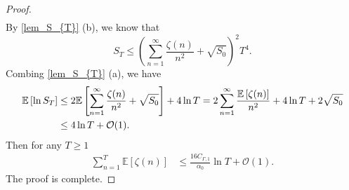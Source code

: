 \documentclass[standalone]{article}
\newcommand{\E}{\mathbb{E}}
\begin{document}
\begin{proof}
\begin{align}
\end{align}
By \cref{lem_S_{T}} (b), we know that $$S_T \leq \left(\sum_{n=1}^{\infty}\frac{\zeta(n)}{n^{2}} + \sqrt{S_0} \right)^2T^4.$$
Combing \cref{lem_S_{T}} (a), we have 
\begin{align}
\E\left[\ln S_T \right] & \leq 2\E\left[\sum_{n=1}^{\infty}\frac{\zeta(n)}{n^{2}} + \sqrt{S_0}\right] + 4\ln T = 2 \sum_{n=1}^{\infty}\frac{\E\left[\zeta(n)\right]}{n^{2}} + 4\ln T + 2\sqrt{S_0} \notag \\
&  \leq 4\ln T + \mathcal{O}(1). \notag
\end{align}
Then for any $T \geq 1$
\begin{equation}\nonumber\begin{aligned}
\sum_{n=1}^{T}\E\left[\zeta(n)\right] & \le  \frac{16C_{\Gamma,1}}{\alpha_0}  \ln T  + \mathcal{O}(1).
\end{aligned}\end{equation}
The proof is complete. 
\end{proof}
\end{document}
